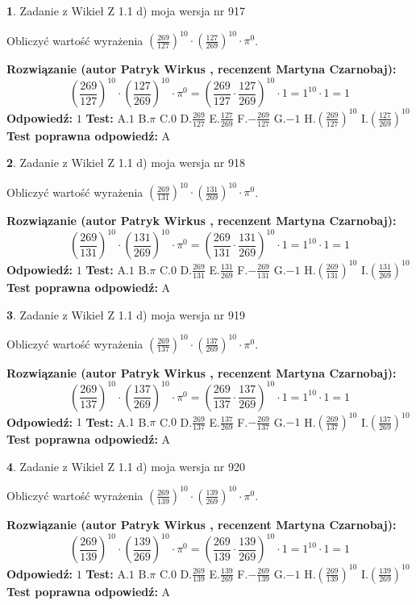 \documentclass[12pt, a4paper]{article}
\theoremstyle{definition} %
\newtheorem{zad}{}
\newcommand{\zadStart}[1]{\begin{zad}#1\newline}
\newcommand{\zadStop}{\end{zad}}
\newcommand{\rozwStart}[2]{\noindent \textbf{Rozwiązanie (autor #1 , recenzent #2): }\newline}
\newcommand{\rozwStop}{\newline}
\newcommand{\odpStart}{\noindent \textbf{Odpowiedź:}\newline}
\newcommand{\odpStop}{\newline}
\newcommand{\testStart}{\noindent \textbf{Test:}\newline}
\newcommand{\testStop}{\newline}
\newcommand{\kluczStart}{\noindent \textbf{Test poprawna odpowiedź:}\newline}
\newcommand{\kluczStop}{\newline}
\begin{document}
\zadStart{Zadanie z Wikieł Z 1.1 d) moja wersja nr 917}

Obliczyć wartość wyrażenia $(\frac{269}{127})^{10} \cdot (\frac{127}{269})^{10} \cdot \pi^{0}$.
\zadStop
\rozwStart{Patryk Wirkus}{Martyna Czarnobaj}
$$(\frac{269}{127})^{10} \cdot (\frac{127}{269})^{10} \cdot \pi^{0} = (\frac{269}{127} \cdot \frac{127}{269})^{10} \cdot 1 = 1^{10} \cdot 1 = 1$$
\rozwStop
\odpStart
$1$
\odpStop
\testStart
A.$1$ B.$\pi$ C.$0$ D.$\frac{269}{127}$ E.$\frac{127}{269}$
F.$-\frac{269}{127}$ G.$-1$
H.$(\frac{269}{127})^{10}$
I.$(\frac{127}{269})^{10}$
\testStop
\kluczStart
A
\kluczStop



\zadStart{Zadanie z Wikieł Z 1.1 d) moja wersja nr 918}

Obliczyć wartość wyrażenia $(\frac{269}{131})^{10} \cdot (\frac{131}{269})^{10} \cdot \pi^{0}$.
\zadStop
\rozwStart{Patryk Wirkus}{Martyna Czarnobaj}
$$(\frac{269}{131})^{10} \cdot (\frac{131}{269})^{10} \cdot \pi^{0} = (\frac{269}{131} \cdot \frac{131}{269})^{10} \cdot 1 = 1^{10} \cdot 1 = 1$$
\rozwStop
\odpStart
$1$
\odpStop
\testStart
A.$1$ B.$\pi$ C.$0$ D.$\frac{269}{131}$ E.$\frac{131}{269}$
F.$-\frac{269}{131}$ G.$-1$
H.$(\frac{269}{131})^{10}$
I.$(\frac{131}{269})^{10}$
\testStop
\kluczStart
A
\kluczStop



\zadStart{Zadanie z Wikieł Z 1.1 d) moja wersja nr 919}

Obliczyć wartość wyrażenia $(\frac{269}{137})^{10} \cdot (\frac{137}{269})^{10} \cdot \pi^{0}$.
\zadStop
\rozwStart{Patryk Wirkus}{Martyna Czarnobaj}
$$(\frac{269}{137})^{10} \cdot (\frac{137}{269})^{10} \cdot \pi^{0} = (\frac{269}{137} \cdot \frac{137}{269})^{10} \cdot 1 = 1^{10} \cdot 1 = 1$$
\rozwStop
\odpStart
$1$
\odpStop
\testStart
A.$1$ B.$\pi$ C.$0$ D.$\frac{269}{137}$ E.$\frac{137}{269}$
F.$-\frac{269}{137}$ G.$-1$
H.$(\frac{269}{137})^{10}$
I.$(\frac{137}{269})^{10}$
\testStop
\kluczStart
A
\kluczStop



\zadStart{Zadanie z Wikieł Z 1.1 d) moja wersja nr 920}

Obliczyć wartość wyrażenia $(\frac{269}{139})^{10} \cdot (\frac{139}{269})^{10} \cdot \pi^{0}$.
\zadStop
\rozwStart{Patryk Wirkus}{Martyna Czarnobaj}
$$(\frac{269}{139})^{10} \cdot (\frac{139}{269})^{10} \cdot \pi^{0} = (\frac{269}{139} \cdot \frac{139}{269})^{10} \cdot 1 = 1^{10} \cdot 1 = 1$$
\rozwStop
\odpStart
$1$
\odpStop
\testStart
A.$1$ B.$\pi$ C.$0$ D.$\frac{269}{139}$ E.$\frac{139}{269}$
F.$-\frac{269}{139}$ G.$-1$
H.$(\frac{269}{139})^{10}$
I.$(\frac{139}{269})^{10}$
\testStop
\kluczStart
A
\kluczStop
\end{document}
